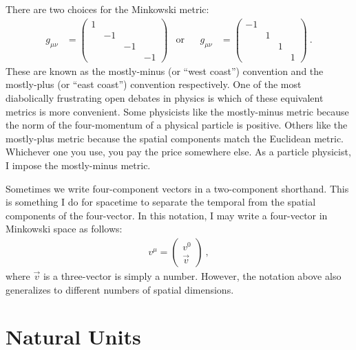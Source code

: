 \documentclass[12pt, oneside]{report}    %
\let\oldsection\section
\def\section{%
  \setcounter{sidenote}{1}%
  \oldsection
}
\begin{document}
\begin{example}
There are two choices for the Minkowski metric:
\begin{align}
    g_{\mu\nu} &= 
    \begin{pmatrix}
        1 & & & \\
        & -1 & & \\
        & & -1 & \\
        & & & -1 
    \end{pmatrix}
    & \text{or}&
    &
    g_{\mu\nu} &= 
    \begin{pmatrix}
        -1 & & & \\
        & 1 & & \\
        & & 1 & \\
        & & & 1 
    \end{pmatrix} \ .
\end{align}
These are known as the mostly-minus (or ``west coast'') convention and the mostly-plus (or ``east coast'') convention respectively. One of the most diabolically frustrating open debates in physics is which of these equivalent metrics is more convenient. Some physicists like the mostly-minus metric because the norm of the four-momentum of a physical particle is positive. Others like the mostly-plus metric because the spatial components match the Euclidean metric. Whichever one you use, you pay the price somewhere else. As a particle physicist, I impose the mostly-minus metric.
\end{example}

Sometimes we write four-component vectors in a two-component shorthand. This is something I do for spacetime to separate the temporal from the spatial components of the four-vector. In this notation, I may write a four-vector in Minkowski space as follows:
\begin{align}
    v^\mu = 
    \begin{pmatrix}
    v^0\\
    \vec{v}    
    \end{pmatrix} \ ,
\end{align}
where $\vec{v}$ is a three-vector is simply a number. However, the notation above also generalizes to different numbers of spatial dimensions.


\section{Natural Units}
\end{document}
